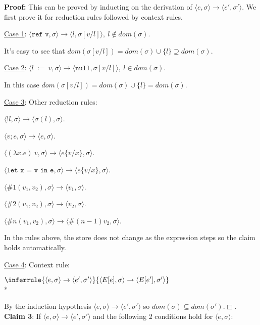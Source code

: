 \documentclass[10pt]{article}
\newcommand{\Rule}[3]{
    \label{rule:#1}
  \hfill
  \ensuremath{\inferrule{#2}{#3}}
  \hfill
}
\begin{document}
\begin{enumerate} [(a)]
    \textbf{Proof:} This can be proved by inducting on the derivation of $\langle e, \sigma \rangle \rightarrow \langle e', \sigma' \rangle$. We first prove it for reduction rules followed by context rules.

    \underline{Case 1}: $\langle \texttt{ref v}, \sigma \rangle \rightarrow \langle l, \sigma[v/l] \rangle,~l \notin dom(\sigma)$.

    It's easy to see that $dom(\sigma[v/l]) = dom(\sigma) \cup \{l\} \supseteq dom(\sigma)$.

    \underline{Case 2}: $\langle l~:=~v, \sigma \rangle \rightarrow \langle \texttt{null}, \sigma[v/l] \rangle,~l \in dom(\sigma)$.

    In this case $dom(\sigma[v/l]) = dom(\sigma) \cup \{l\} = dom(\sigma)$.

    \underline{Case 3}:  Other reduction rules:

    $\langle !l, \sigma \rangle \rightarrow \langle \sigma(l), \sigma\rangle$.

    $\langle v;e, \sigma \rangle \rightarrow \langle e, \sigma \rangle$.

    $\langle (\lambda x.e)~v, \sigma \rangle \rightarrow \langle e\{v/x\}, \sigma \rangle$.

    $\langle \texttt{let x = v in e}, \sigma \rangle \rightarrow \langle e\{v/x\}, \sigma \rangle$.

    $\langle \#1(v_1, v_2), \sigma \rangle \rightarrow \langle v_1, \sigma \rangle$.

    $\langle \#2(v_1, v_2), \sigma \rangle \rightarrow \langle v_2, \sigma \rangle$.

    $\langle \#n(v_1, v_2), \sigma \rangle \rightarrow \langle \#(n-1)v_2, \sigma \rangle$.

    In the rules above, the store does not change as the expression steps so the claim holds automatically.

    \underline{Case 4}: Context rule:

    \Rule{}{
    \langle e, \sigma \rangle \rightarrow \langle e', \sigma' \rangle
  }{
    \langle E[e], \sigma \rangle \rightarrow \langle E[e'], \sigma' \rangle
  } \\*

    By the induction hypothesis $\langle e, \sigma \rangle \rightarrow \langle e', \sigma' \rangle$ so $dom(\sigma) \subseteq dom(\sigma')$.$\Box$.\\

    \textbf{Claim 3}: If $\langle e, \sigma \rangle \rightarrow \langle e', \sigma' \rangle$ and the following 2 conditions hold for $\langle e, \sigma \rangle$:


\end{enumerate}
\end{document}
